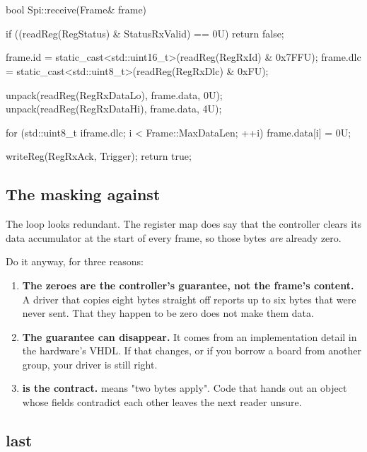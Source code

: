 \section{\texorpdfstring{}{receive()}}
\label{sec:receive}

\begin{cppcode}
bool Spi::receive(Frame& frame)
{
    if ((readReg(RegStatus) & StatusRxValid) == 0U) { return false; }

    frame.id  = static_cast<std::uint16_t>(readReg(RegRxId) & 0x7FFU);
    frame.dlc = static_cast<std::uint8_t>(readReg(RegRxDlc) & 0xFU);

    unpack(readReg(RegRxDataLo), frame.data, 0U);
    unpack(readReg(RegRxDataHi), frame.data, 4U);

    for (std::uint8_t i{frame.dlc}; i < Frame::MaxDataLen; ++i)
    {
        frame.data[i] = 0U;
    }

    writeReg(RegRxAck, Trigger);
    return true;
}
\end{cppcode}

\subsection{The masking against \texorpdfstring{}{dlc}}

The loop looks redundant. The register map does say that the controller clears its data
accumulator at the start of every frame, so those bytes \emph{are} already zero.

Do it anyway, for three reasons:

\begin{enumerate}
  \item \textbf{The zeroes are the controller's guarantee, not the frame's content.} A driver that
    copies eight bytes straight off reports up to six bytes that were never sent. That they happen
    to be zero does not make them data.
  \item \textbf{The guarantee can disappear.} It comes from an implementation detail in the
    hardware's VHDL. If that changes, or if you borrow a board from another group, your driver is
    still right.
  \item \textbf{ is the contract.}  means "two bytes apply". Code
    that hands out an object whose fields contradict each other leaves the next reader unsure.
\end{enumerate}

\subsection{\texorpdfstring{}{RX\_ACK} last}

